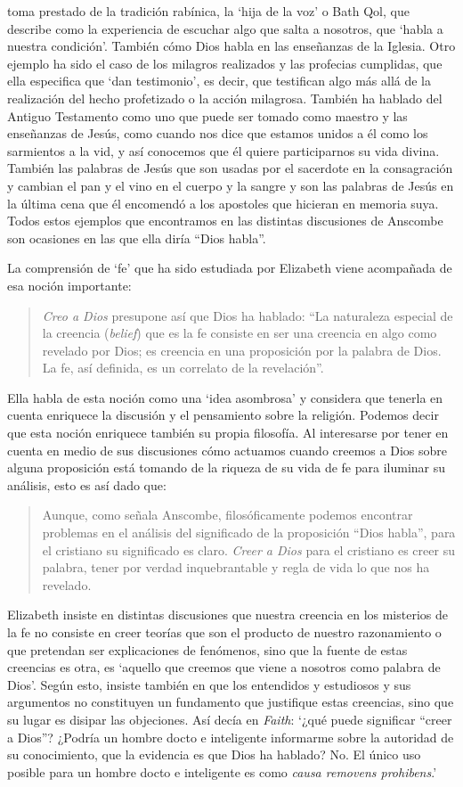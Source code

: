 toma prestado de la tradición rabínica, la `hija de la voz' o Bath Qol, que describe como la experiencia de escuchar algo que salta a nosotros, que `habla a nuestra condición'. También cómo Dios habla en las enseñanzas de la Iglesia. Otro ejemplo ha sido el caso de los milagros realizados y las profecias cumplidas, que ella especifica que `dan testimonio', es decir, que testifican algo más allá de la realización del hecho profetizado o la acción milagrosa. También ha hablado del Antiguo Testamento como uno que puede ser tomado como maestro y las enseñanzas de Jesús, como cuando nos dice que estamos unidos a él como los sarmientos a la vid, y así conocemos que él quiere participarnos su vida divina. También las palabras de Jesús que son usadas por el sacerdote en la consagración y cambian el pan y el vino en el cuerpo y la sangre y son las palabras de Jesús en la última cena que él encomendó a los apostoles que hicieran en memoria suya. Todos estos ejemplos que encontramos en las distintas discusiones de Anscombe son ocasiones en las que ella diría ``Dios habla''.

La comprensión de `fe' que ha sido estudiada por Elizabeth viene acompañada de esa noción importante: \blockquote[{\cite[185]{conesa1994cc}}]{\emph{Creo a Dios} presupone así que Dios ha hablado: \enquote{La naturaleza especial de la creencia (\emph{belief}) que es la fe consiste en ser una creencia en algo como revelado por Dios; es creencia en una proposición por la palabra de Dios. La fe, así definida, es un correlato de la revelación}.} Ella habla de esta noción como una `idea asombrosa' y considera que tenerla en cuenta enriquece la discusión y el pensamiento sobre la religión. Podemos decir que esta noción enriquece también su propia filosofía. Al interesarse por tener en cuenta en medio de sus discusiones cómo actuamos cuando creemos a Dios sobre alguna proposición está tomando de la riqueza de su vida de fe para iluminar su análisis, esto es así dado que: \blockquote[{\cite[185]{conesa1994cc}}]{Aunque, como señala Anscombe, filosóficamente podemos encontrar problemas en el análisis del significado de la proposición \enquote{Dios habla}, para el cristiano su significado es claro. \emph{Creer a Dios} para el cristiano es creer su palabra, tener por verdad inquebrantable y regla de vida lo que nos ha revelado.} Elizabeth insiste en distintas discusiones que nuestra creencia en los misterios de la fe no consiste en creer teorías que son el producto de nuestro razonamiento o que pretendan ser explicaciones de fenómenos, sino que la fuente de estas creencias es otra, es \enquote*{aquello que creemos que viene a nosotros como palabra de Dios}. Según esto, insiste también en que los entendidos y estudiosos y sus argumentos no constituyen un fundamento que justifique estas creencias, sino que su lugar es disipar las objeciones. Así decía en \emph{Faith}: \enquote*{¿qué puede significar ``creer a Dios''? ¿Podría un hombre docto e inteligente informarme sobre la autoridad de su conocimiento, que la evidencia es que Dios ha hablado? No. El único uso posible para un hombre docto e inteligente es como \emph{causa removens prohibens}.}

